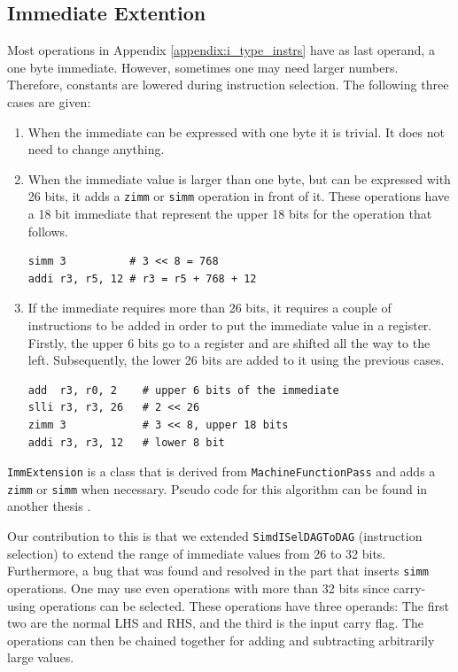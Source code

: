 \subsection{Immediate Extention}\label{sec:immediate_ext}
Most operations in Appendix \ref{appendix:i_type_instrs} have as last operand, a one byte immediate. However, sometimes one may need larger numbers. Therefore, constants are lowered during instruction selection. The following three cases are given:
\begin{enumerate}
\item When the immediate can be expressed with one byte it is trivial. It does not need to change anything.
\item When the immediate value is larger than one byte, but can be expressed with 26 bits, it adds a \texttt{zimm} or \texttt{simm} operation in front of it. These operations have a 18 bit immediate that represent the upper 18 bits for the operation that follows.

\begin{lstlisting}
simm 3          # 3 << 8 = 768
addi r3, r5, 12 # r3 = r5 + 768 + 12
\end{lstlisting}
\item If the immediate requires more than 26 bits, it requires a couple of instructions to be added in order to put the immediate value in a register. Firstly, the upper 6 bits go to a register and are shifted all the way to the left. Subsequently, the lower 26 bits are added to it using the previous cases.
\begin{lstlisting}
add  r3, r0, 2    # upper 6 bits of the immediate
slli r3, r3, 26   # 2 << 26
zimm 3            # 3 << 8, upper 18 bits
addi r3, r3, 12   # lower 8 bit
\end{lstlisting}
\end{enumerate}

\texttt{ImmExtension} is a class that is derived from \texttt{MachineFunctionPass} and adds a \texttt{zimm} or \texttt{simm} when necessary. Pseudo code for this algorithm can be found in another thesis \cite[Appendix B]{liu_zhenyuan}. 

Our contribution to this is that we extended \texttt{SimdISelDAGToDAG} (instruction selection) to extend the range of immediate values from 26 to 32 bits. Furthermore, a bug that was found and resolved in the part that inserts \texttt{simm} operations. One may use even operations with more than 32 bits since carry-using operations can be selected. These operations have three operands: The first two are the normal LHS and RHS, and the third is the input carry flag. The operations can then be chained together for adding and subtracting arbitrarily large values.

